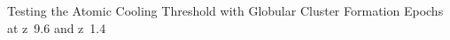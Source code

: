 \documentclass[]{article}
\begin{document}
Testing the Atomic Cooling Threshold with Globular Cluster Formation Epochs at z~9.6 and z~1.4
\end{document}

